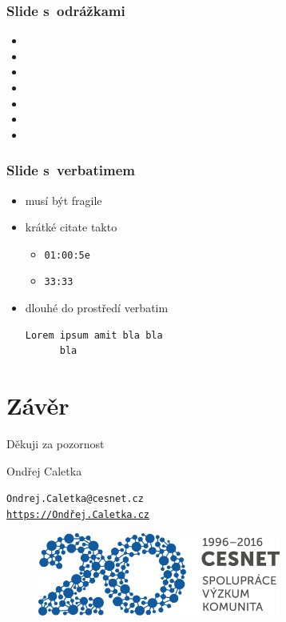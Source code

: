 \documentclass[hyperref={pdfpagelabels=false},xcolor=dvipsnames,12pt,aspectratio=169]{beamer}
\begin{document}
\begin{frame}
	\frametitle{Slide s~odrážkami}
	\begin{itemize}
		\item 
		\item 
		\item 
		\item 
		\item 
		\item 
		\item 
	\end{itemize}
\end{frame}

\begin{frame}[fragile]
	\frametitle{Slide s~verbatimem}
	\begin{itemize}
		\item musí být fragile
		\item krátké citate takto
		\begin{itemize}
				\item \verb|01:00:5e| 
				\item \verb|33:33|
		\end{itemize}
		\item dlouhé do prostředí verbatim
		\begin{verbatim}
Lorem ipsum amit bla bla 
      bla
		\end{verbatim}
	\end{itemize}
\end{frame}

\section*{Závěr}
{
\begin{frame}
 \begin{center}
 \large Děkuji za pozornost

 \vspace{1cm}
 Ondřej Caletka

 \texttt{Ondrej.Caletka@cesnet.cz} \\
 \texttt{\href{https://xn--ondej-kcb.caletka.cz}{https://Ondřej.Caletka.cz}}
 \begin{figure}
 \includegraphics[width=8cm]{fig/cesnet-20let-rozsirena}
 \end{figure}
 \end{center}
\end{frame}
}
\end{document}

